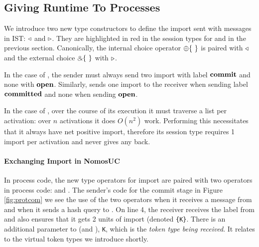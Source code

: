 \subsection{Giving Runtime To Processes}
We introduce two new type constructors to define the import sent with messages in IST: $\triangleleft$ and $\triangleright$.
They are highlighted in red in the session types for \Fcom and \Fro in the previous section.
Canonically, the internal choice operator $\ichoice$ is paired with $\triangleleft$ and the external choice $\echoice$ with $\triangleright$.

In the case of \Fcom, the sender must always send two import with label $\mathbf{commit}$ and none with $\mathbf{open}$.
Similarly, \Fcom sends one import to the receiver when sending label $\mathbf{committed}$ and none when sending $\mathbf{open}$.

In the case of \Fro, over the course of its execution it must traverse a list per activation:
over $n$ activations it does $O(n^2)$ work.
Performing this necessitates that it always have net positive import, therefore its session type requires 1 import per activation and never gives any back.

%

\paragraph{Exchanging Import in NomosUC}
In process code, the new type operators for import are paired with two operators in process code: \ipay and \iget.
The sender's code for the commit stage in Figure \ref{fig:protcom} we see the use of the two operators when it receives a message from \Z and when it sends a hash query to \Fro.
On line 4, the receiver receives the label from \Z and also ensures that it gets 2 units of import (denoted \texttt{\{K\}}.
There is an additional parameter to \iget (and \ipay), \texttt{K}, which is the \emph{token type being received}. 
It relates to the virtual token types we introduce shortly.

